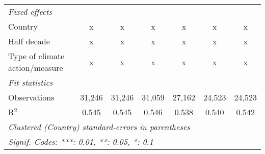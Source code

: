 \begin{tabular}{lcccccc}
   \emph{Fixed effects}\\
   Country                                      & x       & x       & x       & x            & x             & x\\  
   Half decade                                  & x       & x       & x       & x            & x             & x\\  
   Type of climate action/measure               & x       & x       & x       & x            & x             & x\\  
   \midrule \emph{Fit statistics}\\
   Observations                                 & 31,246  & 31,246  & 31,059  & 27,162       & 24,523        & 24,523\\  
   R$^2$                                        & 0.545   & 0.545   & 0.546   & 0.538        & 0.540         & 0.542\\  
   \midrule
   \multicolumn{7}{l}{\emph{Clustered (Country) standard-errors in parentheses}}\\
   \multicolumn{7}{l}{\emph{Signif. Codes: ***: 0.01, **: 0.05, *: 0.1}}\\
\end{tabular}
\par\endgroup


